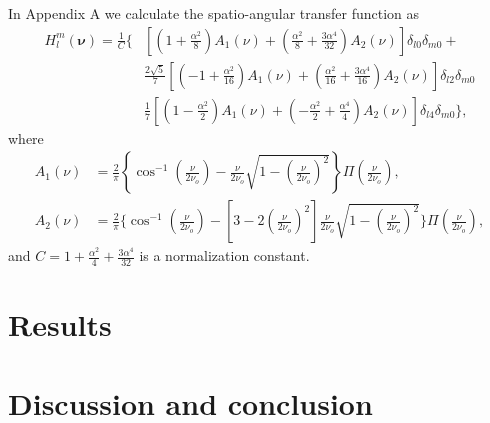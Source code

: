 \documentclass{osa-article}
\providecommand{\bs}[1]{\boldsymbol{#1}}
\begin{document}
In Appendix A we calculate the spatio-angular transfer function as
\begin{align}
  H_l^m(\bs{\nu}) = \frac{1}{C}\Bigg\{&\left[\left(1 + \frac{\alpha^2}{8}\right)A_1(\nu) + \left(\frac{\alpha^2}{8} + \frac{3\alpha^4}{32}\right)A_2(\nu)\right]\delta_{l0}\delta_{m0}+\nonumber\\&\frac{2\sqrt{5}}{7}\left[\left(-1 + \frac{\alpha^2}{16}\right)A_1(\nu) + \left(\frac{\alpha^2}{16} + \frac{3\alpha^4}{16}\right)A_2(\nu)\right]\delta_{l2}\delta_{m0}\nonumber\\&\frac{1}{7}\left[\left(1 - \frac{\alpha^2}{2}\right)A_1(\nu) + \left(-\frac{\alpha^2}{2} + \frac{\alpha^4}{4}\right)A_2(\nu)\right]\delta_{l4}\delta_{m0}\Bigg\}, 
\end{align}
where
\begin{align}
  A_1(\nu) &= \frac{2}{\pi}\left\{\cos^{-1}\left(\frac{\nu}{2\nu_o}\right) - \frac{\nu}{2\nu_o}\sqrt{1 - \left(\frac{\nu}{2\nu_o}\right)^2}\right\}\Pi\left(\frac{\nu}{2\nu_o}\right), \\
  A_2(\nu) &= \frac{2}{\pi}\Bigg\{\cos^{-1}\left(\frac{\nu}{2\nu_o}\right) - \left[3 - 2\left(\frac{\nu}{2\nu_o}\right)^2\right]\frac{\nu}{2\nu_o}\sqrt{1 - \left(\frac{\nu}{2\nu_o}\right)^2}\Bigg\}\Pi\left(\frac{\nu}{2\nu_o}\right), 
\end{align}
and $C = 1 + \frac{\alpha^2}{4} + \frac{3\alpha^4}{32}$ is a normalization
constant.

\section{Results}

\section{Discussion and conclusion}


\appendix
\end{document}

